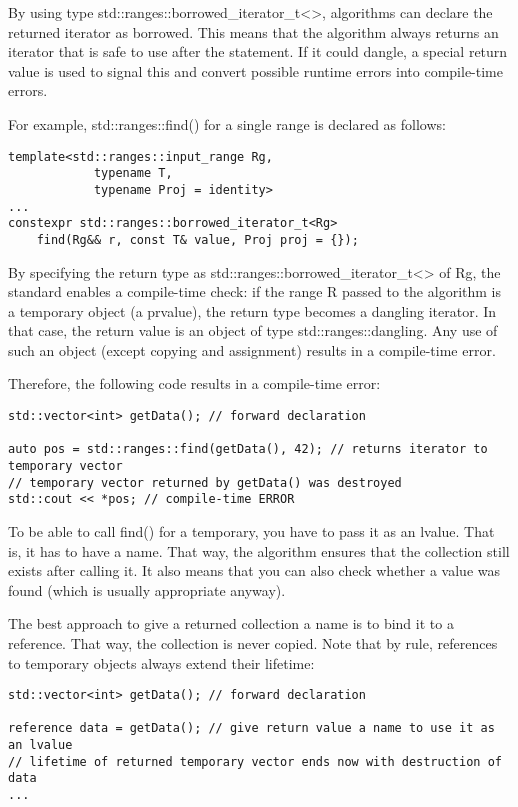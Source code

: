 By using type std::ranges::borrowed\_iterator\_t<>, algorithms can declare the returned iterator as borrowed. This means that the algorithm always returns an iterator that is safe to use after the statement. If it could dangle, a special return value is used to signal this and convert possible runtime errors into compile-time errors.

For example, std::ranges::find() for a single range is declared as follows:

\begin{lstlisting}[style=styleCXX]
template<std::ranges::input_range Rg,
			typename T,
			typename Proj = identity>
...
constexpr std::ranges::borrowed_iterator_t<Rg>
	find(Rg&& r, const T& value, Proj proj = {});
\end{lstlisting}

By specifying the return type as std::ranges::borrowed\_iterator\_t<> of Rg, the standard enables a compile-time check: if the range R passed to the algorithm is a temporary object (a prvalue), the return type becomes a dangling iterator. In that case, the return value is an object of type std::ranges::dangling. Any use of such an object (except copying and assignment) results in a compile-time error.

Therefore, the following code results in a compile-time error:

\begin{lstlisting}[style=styleCXX]
std::vector<int> getData(); // forward declaration

auto pos = std::ranges::find(getData(), 42); // returns iterator to temporary vector
// temporary vector returned by getData() was destroyed
std::cout << *pos; // compile-time ERROR
\end{lstlisting}

To be able to call find() for a temporary, you have to pass it as an lvalue. That is, it has to have a name. That way, the algorithm ensures that the collection still exists after calling it. It also means that you can also check whether a value was found (which is usually appropriate anyway).

The best approach to give a returned collection a name is to bind it to a reference. That way, the collection is never copied. Note that by rule, references to temporary objects always extend their lifetime:

\begin{lstlisting}[style=styleCXX]
std::vector<int> getData(); // forward declaration

reference data = getData(); // give return value a name to use it as an lvalue
// lifetime of returned temporary vector ends now with destruction of data
...
\end{lstlisting}

